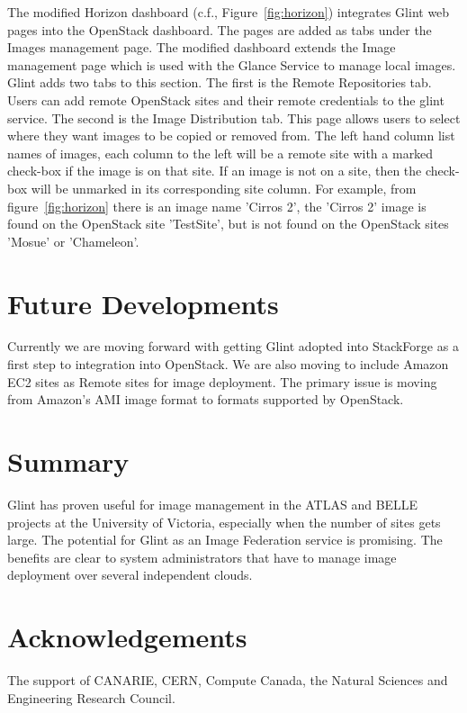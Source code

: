 \documentclass[a4paper]{jpconf}
\begin{document}
The modified Horizon dashboard (c.f., Figure~\ref{fig:horizon}) integrates Glint web pages into the OpenStack dashboard. The pages are added as tabs under the Images management page. The modified dashboard extends the Image management page which is used with the Glance Service to manage local images. Glint adds two tabs to this section. The first is the Remote Repositories tab. Users can add remote OpenStack sites and their remote credentials to the glint service. The second is the Image Distribution tab. This page allows users to select where they want images to be copied or removed from. The left hand column list names of images, each column to the left will be a remote site with a marked check-box if the image is on that site. If an image is not on a site, then the check-box will be unmarked in its corresponding site column. For example, from figure~\ref{fig:horizon} there is an image name 'Cirros 2', the 'Cirros 2' image is found on the OpenStack site 'TestSite', but is not found on the OpenStack sites 'Mosue' or 'Chameleon'. 

\section{Future Developments}
Currently we are moving forward with getting Glint adopted into StackForge as a first step to integration into OpenStack. We are also moving to include Amazon EC2 sites as Remote sites for image deployment. The primary issue is moving from Amazon's AMI image format to formats supported by OpenStack. 

\section{Summary}
Glint has proven useful for image management in the ATLAS and BELLE projects at the University of Victoria, especially when the number of sites gets large. The potential for Glint as an Image Federation service is promising. The benefits are clear to system administrators that have to manage image deployment over several independent clouds. 

\section*{Acknowledgements}
The support of CANARIE, CERN, Compute Canada, the Natural Sciences and Engineering Research Council.
\end{document}

